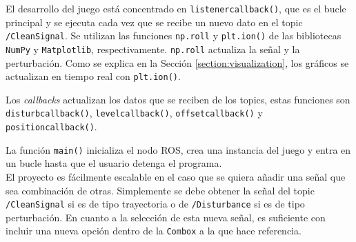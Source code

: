El desarrollo del juego está concentrado en \verb|listenercallback()|, que es el bucle principal y se ejecuta cada vez que se recibe un nuevo dato en el topic \verb|/CleanSignal|.
Se utilizan las funciones \verb|np.roll| y \verb|plt.ion()| de las bibliotecas \verb|NumPy| y \verb|Matplotlib|, respectivamente.
\verb|np.roll| actualiza la señal y la perturbación.
Como se explica en la Sección \ref{section:visualization}, los gráficos se actualizan en tiempo real con \verb|plt.ion()|.

Los \textit{callbacks} actualizan los datos que se reciben de los topics, estas funciones son \verb|disturbcallback()|, \verb|levelcallback()|, \verb|offsetcallback()| y \verb|positioncallback()|.

La función \verb|main()| inicializa el nodo ROS, crea una instancia del juego y entra en un bucle hasta que el usuario detenga el programa.\\

El proyecto es fácilmente escalable en el caso que se quiera añadir una señal que sea combinación de otras.
Simplemente se debe obtener la señal del topic \verb|/CleanSignal| si es de tipo trayectoria o de \verb|/Disturbance| si es de tipo perturbación.
En cuanto a la selección de esta nueva señal, es suficiente con incluir una nueva opción dentro de la \verb|Combox| a la que hace referencia.
